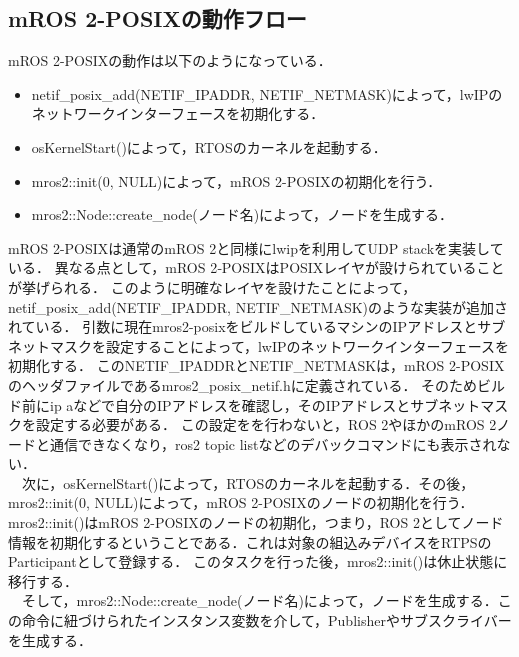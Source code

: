 \subsection{mROS 2-POSIXの動作フロー}
mROS 2-POSIXの動作は以下のようになっている．
\begin{itemize}
    \item netif\_posix\_add(NETIF\_IPADDR, NETIF\_NETMASK)によって，lwIPのネットワークインターフェースを初期化する．
    \item osKernelStart()によって，RTOSのカーネルを起動する．
    \item mros2::init(0, NULL)によって，mROS 2-POSIXの初期化を行う．
    \item mros2::Node::create\_node(ノード名)によって，ノードを生成する．
\end{itemize}
mROS 2-POSIXは通常のmROS 2と同様にlwipを利用してUDP stackを実装している．
異なる点として，mROS 2‐POSIXはPOSIXレイヤが設けられていることが挙げられる．
このように明確なレイヤを設けたことによって，netif\_posix\_add(NETIF\_IPADDR, NETIF\_NETMASK)のような実装が追加されている．
引数に現在mros2-posixをビルドしているマシンのIPアドレスとサブネットマスクを設定することによって，lwIPのネットワークインターフェースを初期化する．
このNETIF\_IPADDRとNETIF\_NETMASKは，mROS 2-POSIXのヘッダファイルであるmros2\_posix\_netif.hに定義されている．
そのためビルド前にip aなどで自分のIPアドレスを確認し，そのIPアドレスとサブネットマスクを設定する必要がある．
この設定をを行わないと，ROS 2やほかのmROS 2ノードと通信できなくなり，ros2 topic listなどのデバックコマンドにも表示されない．
\\　次に，osKernelStart()によって，RTOSのカーネルを起動する．その後，mros2::init(0, NULL)によって，mROS 2-POSIXのノードの初期化を行う．
mros2::init()はmROS 2-POSIXのノードの初期化，つまり，ROS 2としてノード情報を初期化するということである．これは対象の組込みデバイスをRTPSのParticipantとして登録する．
このタスクを行った後，mros2::init()は休止状態に移行する．
\\　そして，mros2::Node::create\_node(ノード名)によって，ノードを生成する．この命令に紐づけられたインスタンス変数を介して，Publisherやサブスクライバーを生成する．

